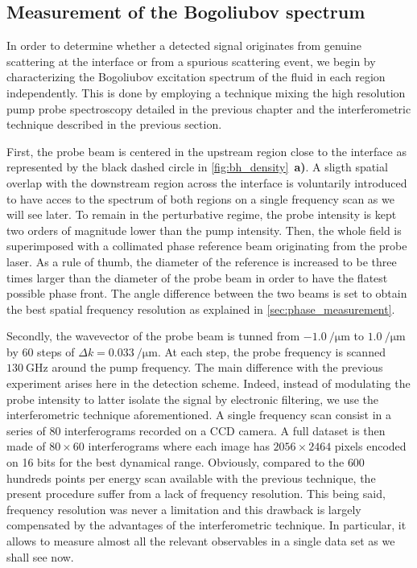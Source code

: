 \subsection{Measurement of the Bogoliubov spectrum}

In order to determine whether a detected signal originates from genuine scattering at the interface or from a spurious scattering event, we begin by characterizing the Bogoliubov excitation spectrum of the fluid in each region independently.
This is done by employing a technique mixing the high resolution pump probe spectroscopy detailed in the previous chapter and the interferometric technique described in the previous section.

\bigskip

First, the probe beam is centered in the upstream region close to the interface as represented by the black dashed circle in \autoref{fig:bh_density}~\textbf{a)}.
A sligth spatial overlap with the downstream region across the interface is voluntarily introduced to have acces to the spectrum of both regions on a single frequency scan as we will see later. To remain in 
the perturbative regime, the probe intensity is kept two orders of magnitude lower than the pump intensity.
Then, the whole field is superimposed with a collimated phase reference beam originating from the probe laser. As a rule of thumb, the diameter of the reference is 
increased to be three times larger than the diameter of the probe beam in order to have the flatest possible phase front.
 The angle difference between the two beams is set to obtain the best spatial frequency resolution as explained in \autoref{sec:phase_measurement}.


Secondly, the wavevector of the probe beam is tunned from $\SI{-1.0}{\per \micro \meter}$ to $\SI{1.0}{\per \micro \meter}$ by 60 steps of $\Delta k =\SI{0.033}{\per \micro \meter}$.
At each step, the probe frequency is scanned $\SI{130}{\giga \hertz}$ around the pump frequency. The main difference with the previous experiment arises here in the detection scheme. Indeed, instead of modulating 
the probe intensity to latter isolate the signal by electronic filtering, we use the interferometric technique aforementioned. A single frequency scan consist 
in a series of 80 interferograms recorded on a CCD camera. A full dataset is then made of $80\times 60$ interferograms where each image has $2056\times 2464$ pixels encoded on 16 bits
for the best dynamical range. Obviously, compared to the $600$ hundreds points per energy scan available with the previous technique,
the present procedure suffer from a lack of frequency resolution. This being said, frequency resolution was never a limitation and this drawback
is largely compensated by the advantages of the interferometric technique. In particular, it allows to measure almost all the relevant observables in a single data set 
as we shall see now. 

